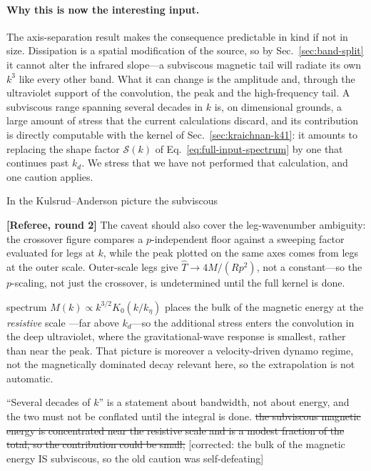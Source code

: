 \documentclass[10pt,prd,aps,nobibnotes,superscriptaddress,preprintnumbers,notitlepage]{revtex4-1}
\newcommand{\rev}[1]{\par\noindent\begin{tcolorbox}[colback=blue!4,colframe=blue!55,
    boxrule=0.5pt,left=3pt,right=3pt,top=2pt,bottom=2pt,breakable]
    \footnotesize\textcolor{blue!65!black}{\textbf{[Referee, round 2]} #1}\end{tcolorbox}\par}
\newcommand{\revX}[1]{\par\noindent\begin{tcolorbox}[colback=red!5,colframe=red!70!black,
    boxrule=1pt,left=3pt,right=3pt,top=2pt,bottom=2pt,breakable]
    \footnotesize\textcolor{red!70!black}{\textbf{[Referee, round 2 --- BLOCKING]} #1}\end{tcolorbox}\par}
\newcommand{\rev}[1]{}\newcommand{\revX}[1]{}
\newcommand{\add}[1]{{\color{red}#1}}
\newcommand{\del}[1]{{\color{red}\sout{#1}}}
\newcommand{\why}[1]{{\color{red}\footnotesize\textsf{[#1]}}}
\newcommand{\add}[1]{#1}
\newcommand{\del}[1]{}
\newcommand{\why}[1]{}
\begin{document}
\paragraph{Why this is now the interesting input.} The axis-separation result makes
the consequence predictable in kind if not in size. Dissipation is a spatial
modification of the source, so by Sec.~\ref{sec:band-split} it cannot alter the
infrared slope---a subviscous magnetic tail will radiate its own $k^{3}$ like every
other band. What it can change is the amplitude and, through the ultraviolet
support of the convolution, the peak and the high-frequency tail. A subviscous range
spanning several decades in $k$ is, on dimensional grounds, a large amount of stress
that the current
calculations discard, and its contribution is directly computable with the kernel of
Sec.~\ref{sec:kraichnan-k41}: it amounts to replacing the shape factor
$\mathcal{S}(k)$ of Eq.~\eqref{eq:full-input-spectrum} by one that continues past
$k_d$. We stress that we have not performed that calculation, and one caution
applies. \add{In the Kulsrud--Anderson picture \cite{Kulsrud:1992rk} the subviscous
\rev{The caveat should also cover the leg-wavenumber ambiguity: the crossover figure
compares a $p$-independent floor against a sweeping factor evaluated for legs at $k$,
while the peak plotted on the same axes comes from legs at the outer scale. Outer-scale
legs give $\hat T\to4M/(Rp^{2})$, not a constant---so the $p$-scaling, not just the
crossover, is undetermined until the full kernel is done.}
spectrum $M(k)\propto k^{3/2}K_0(k/k_\eta)$ places the bulk of the magnetic energy at
the \emph{resistive} scale \cite{Schekochihin:2003bg}---far above $k_d$---so the
additional stress enters the convolution in the deep ultraviolet, where the
gravitational-wave response is smallest, rather than near the peak. That picture is
moreover a velocity-driven dynamo regime, not the magnetically dominated decay relevant
here, so the extrapolation is not automatic.} ``Several decades of $k$'' is a statement
about bandwidth, not about energy, and the two must not be conflated until the integral
is done.
\del{the subviscous magnetic energy is concentrated near the resistive scale and is a
modest fraction of the total, so the contribution could be small;}
\why{corrected: the bulk of the magnetic energy IS subviscous, so the old caution was
self-defeating}
\end{document}
